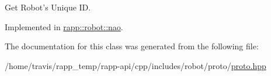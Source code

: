 Get Robot's Unique I\-D. 



Implemented in \hyperlink{classrapp_1_1robot_1_1nao_a0eb438d37b7958554ba43b7b3cddf131}{rapp\-::robot\-::nao}.



The documentation for this class was generated from the following file\-:\begin{DoxyCompactItemize}
\item 
/home/travis/rapp\-\_\-temp/rapp-\/api/cpp/includes/robot/proto/\hyperlink{proto_8hpp}{proto.\-hpp}\end{DoxyCompactItemize}

